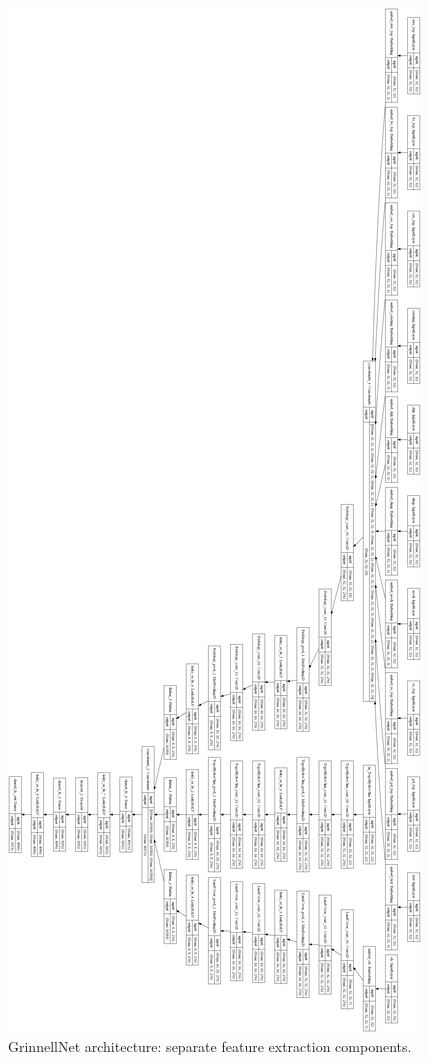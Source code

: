 \documentclass[]{article}
\begin{document}

	

\appendix
\begin{figure}
	\centering
	\includegraphics[scale=0.15]{grinnell}
	\caption{GrinnellNet architecture: separate feature extraction components.}
	\label{grinnarchi}
\end{figure}
\end{document}
